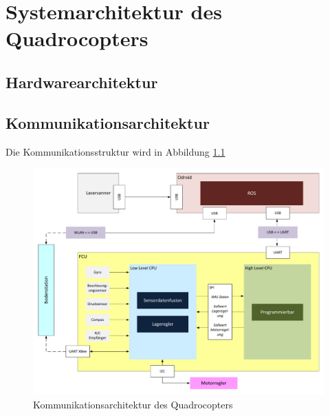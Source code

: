 \chapter{Systemarchitektur des Quadrocopters}
\label{chap:Systemarchitektur}

\section{Hardwarearchitektur}
\label{sec:Hardwarearchitektur}


\section{Kommunikationsarchitektur}
\label{sec:Kommunikationsarchitekur}

Die Kommunikationsstruktur wird in Abbildung \ref{fig:Kommunikationsarchitektur}
\begin{figure}
	\includegraphics[width = \textwidth]{images/Kommunikationsarchitektur}
		\caption[Kommunikationsarchitektur]{Kommunikationsarchitektur des Quadrocopters}
		\label{fig:Kommunikationsarchitektur}
\end{figure}
